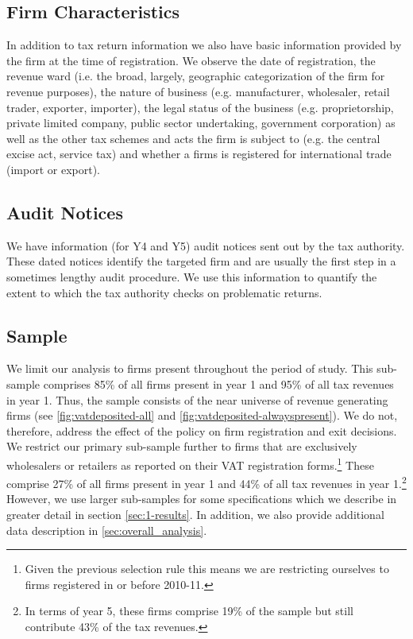 \subsection{Firm Characteristics}
\label{subsec:1-data-dp}
In addition to tax return information we also have basic information provided by the firm at the time of registration. We observe the date of registration, the revenue ward (i.e. the broad, largely, geographic
categorization of the firm for revenue purposes), the nature of business (e.g. manufacturer, wholesaler, retail trader, exporter, importer), the legal status of the business (e.g. proprietorship, private limited company, public sector undertaking, government corporation) as well as the other tax schemes and acts the firm is
subject to (e.g. the central excise act, service tax) and whether a firms is registered for international trade (import or export).

\subsection{Audit Notices}
\label{subsec:1-data-audit}
We have information (for Y4 and Y5) audit notices sent out by the tax authority. These dated notices identify the targeted firm and are usually the first step in a sometimes lengthy audit procedure. We use this information to quantify the extent to which the tax authority checks on problematic returns.

\subsection{Sample}
\label{subsec:sample}
We limit our analysis to firms present throughout the period of study. This sub-sample comprises 85\% of all firms present in year 1 and 95\% of all tax revenues in year 1. Thus, the sample consists of the near universe of revenue generating firms (see \cref{fig:vatdeposited-all} and \cref{fig:vatdeposited-alwayspresent}). We do not, therefore, address the effect of the policy on firm registration and exit decisions. We restrict our primary sub-sample further to firms that are exclusively wholesalers or retailers as reported on their VAT registration forms.\footnote{Given the previous selection rule this means we are  restricting ourselves to firms registered in or before 2010-11.} These comprise 27\% of all firms present in year 1 and 44\% of all tax revenues in year 1.\footnote{In terms of year 5, these firms comprise 19\% of the sample but still contribute 43\% of the tax revenues.} However, we use larger sub-samples for some specifications which we describe in greater detail in section \ref{sec:1-results}. In addition, we also provide additional data description in \cref{sec:overall_analysis}.

